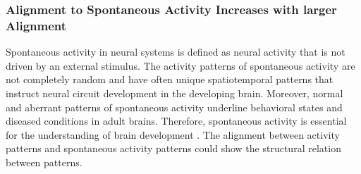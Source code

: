 \documentclass[11pt]{article}
\begin{document}
	\subsubsection{Alignment to Spontaneous Activity Increases with larger Alignment}
	
	Spontaneous activity in neural systems is defined as neural activity that is not driven by an external stimulus. The activity patterns of spontaneous activity are not completely random and have often unique spatiotemporal patterns that instruct neural circuit development in the developing brain. Moreover, normal and aberrant patterns of spontaneous activity underline behavioral states and diseased conditions in adult brains. Therefore, spontaneous activity is essential for the understanding of brain development \cite{imaizumi2018spontaneous}. The alignment between activity patterns and spontaneous activity patterns could show the structural relation between patterns. %
	
\end{document}
